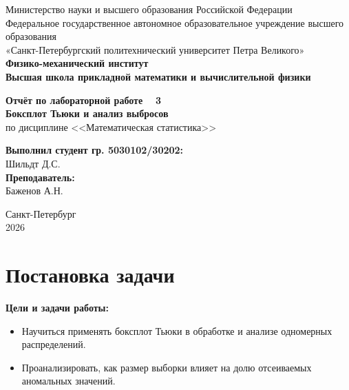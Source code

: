 \documentclass[a4paper, 14pt]{extarticle}
\begin{document}
\begin{titlepage}
    \begin{center}
        Министерство науки и высшего образования Российской Федерации\\
        Федеральное государственное автономное образовательное учреждение высшего образования\\
        «Санкт-Петербургский политехнический университет Петра Великого»\\
        
        \textbf{Физико-механический институт}\\
        \textbf{Высшая школа прикладной математики и вычислительной физики}
    \end{center}

    \vfill
    
    \begin{center}
        \textbf{Отчёт по лабораторной работе \textnumero~ 3\\[0.5cm]}
        \textbf{Боксплот Тьюки и анализ выбросов\\}
        по дисциплине <<Математическая статистика>>
    \end{center}

    \vfill

    \hfill
    \begin{minipage}{0.45\textwidth}
        \textbf{Выполнил студент гр. 5030102/30202:}\\
        Шильдт Д.С.\\[0.5cm]
        \textbf{Преподаватель:}\\ 
        Баженов А.Н.
    \end{minipage}

    \vfill

    \begin{center}
        Санкт-Петербург\\2026
    \end{center}
\end{titlepage}

\setcounter{page}{2}

\tableofcontents
\newpage

\section{Постановка задачи}

\textbf{Цели и задачи работы:}
\begin{itemize}
    \item Научиться применять боксплот Тьюки в обработке и анализе одномерных распределений.
    \item Проанализировать, как размер выборки влияет на долю отсеиваемых аномальных значений.
\end{itemize}
\end{document}
